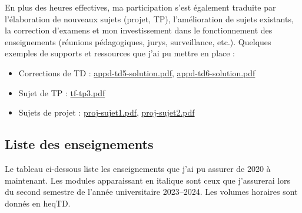 \documentclass[12pt]{article}
\begin{document}
En plus des heures effectives, ma participation s'est également traduite par l'élaboration de
nouveaux sujets (projet, TP), l'amélioration de sujets existants, la correction d'examens et mon
investissement dans le fonctionnement des enseignements (réunions pédagogiques, jurys, surveillance,
etc.).  
Quelques exemples de supports et ressources que j'ai pu mettre en place :
\begin{itemize}
    \item Corrections de TD :
    \href{https://anthonydugois.github.io/resources/appd-td5-solution.pdf}{appd-td5-solution.pdf},
    \href{https://anthonydugois.github.io/resources/appd-td6-solution.pdf}{appd-td6-solution.pdf}
    \item Sujet de TP :
    \href{https://anthonydugois.github.io/resources/tf-tp3.pdf}{tf-tp3.pdf}
    \item Sujets de projet :
    \href{https://anthonydugois.github.io/resources/proj-sujet1.pdf}{proj-sujet1.pdf},
    \href{https://anthonydugois.github.io/resources/proj-sujet2.pdf}{proj-sujet2.pdf}
\end{itemize}

\subsection{Liste des enseignements}

Le tableau ci-dessous liste les enseignements que j'ai pu assurer de 2020 à maintenant.  
Les modules apparaissant en italique sont ceux que j'assurerai lors du second semestre de l'année
universitaire 2023--2024.  
Les volumes horaires sont donnés en heqTD.
\end{document}
